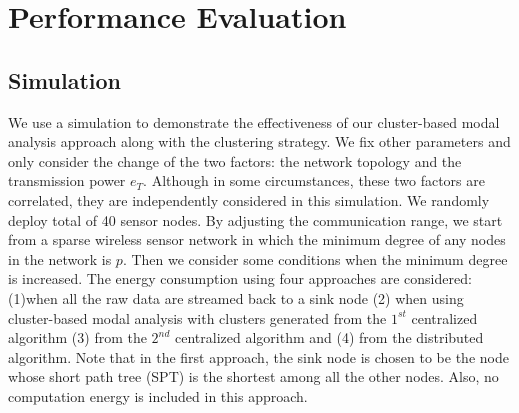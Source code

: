 \section{Performance Evaluation}
\subsection{Simulation}
We use a simulation to demonstrate the effectiveness of our cluster-based modal analysis approach along with the clustering strategy. We fix other parameters and only consider the change of the two factors: the network topology and the transmission power \(e_T\). Although in some circumstances, these two factors are correlated, they are independently considered in this simulation. We randomly deploy total of 40 sensor nodes. By adjusting the communication range, we start from a sparse wireless sensor network in which the minimum degree of any nodes in the network is \(p\). Then we consider some conditions when the minimum degree is increased. The energy consumption using four approaches are considered:(1)when all the raw data are streamed back to a sink node (2) when using cluster-based modal analysis with clusters generated from the \(1^{st}\) centralized algorithm (3) from the \(2^{nd}\) centralized algorithm and (4) from the distributed algorithm. Note that in the first approach, the sink node is chosen to be the node whose short path tree (SPT) is the shortest among all the other nodes. Also, no computation energy is included in this approach.

